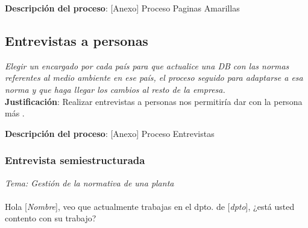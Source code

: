 \documentclass[twoside]{article}
\begin{document}
\textbf{Descripción del proceso}: [Anexo] Proceso Paginas Amarillas

\subsection{Entrevistas a personas}
\label{sec:entrevistas}
\textit{Elegir un encargado por cada país para que actualice una DB con las normas referentes al medio ambiente en ese país, el proceso seguido para adaptarse a esa norma y que haga llegar los cambios al resto de la empresa.}
\\

\textbf{Justificación}: Realizar entrevistas a personas nos permitiría dar con la persona más .

\textbf{Descripción del proceso}: [Anexo] Proceso Entrevistas

\subsubsection{Entrevista semiestructurada}
\textit{Tema: Gestión de la normativa de una planta}\\\\
Hola [\textit{Nombre}], veo que actualmente trabajas en el dpto. de [\textit{dpto}], ¿está usted contento con su trabajo?
\end{document}

